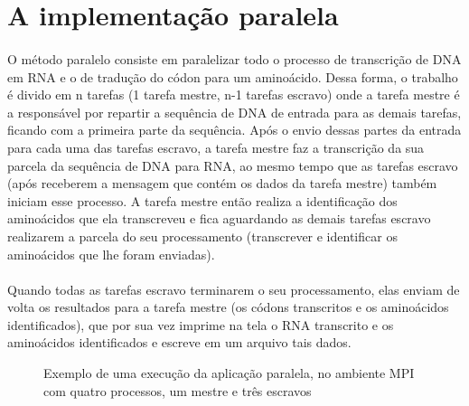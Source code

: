 \documentclass[a4paper,10pt]{article}
\begin{document}
\section{A implementação paralela}

\paragraph{}O método paralelo consiste em paralelizar todo o processo de transcrição de DNA em RNA e o de tradução do códon para um aminoácido. Dessa forma, o trabalho é divido em n tarefas (1 tarefa mestre, n-1 tarefas escravo) onde a tarefa mestre é a responsável por repartir a sequência de DNA de entrada para as demais tarefas, ficando com a primeira parte da sequência. Após o envio dessas partes da entrada para cada uma das tarefas escravo, a tarefa mestre faz a transcrição da sua parcela da sequência de DNA para RNA, ao mesmo tempo que as tarefas escravo (após receberem a mensagem que contém os dados da tarefa mestre) também iniciam esse processo. A tarefa mestre então realiza a identificação dos aminoácidos que ela transcreveu e fica aguardando as demais tarefas escravo realizarem a parcela do seu processamento (transcrever e identificar os aminoácidos que lhe foram enviadas).\\
\paragraph{}Quando todas as tarefas escravo terminarem o seu processamento, elas enviam de volta os resultados para a tarefa mestre (os códons transcritos e os aminoácidos identificados), que por sua vez imprime na tela o RNA transcrito e os aminoácidos identificados e escreve em um arquivo tais dados.

\begin{figure}[!htb]
\centering
{}
\quad
{}
\caption{Exemplo de uma execução da aplicação paralela, no ambiente MPI com quatro processos, um mestre e três escravos}
\label{Figura 1}
\end{figure}
\end{document}
